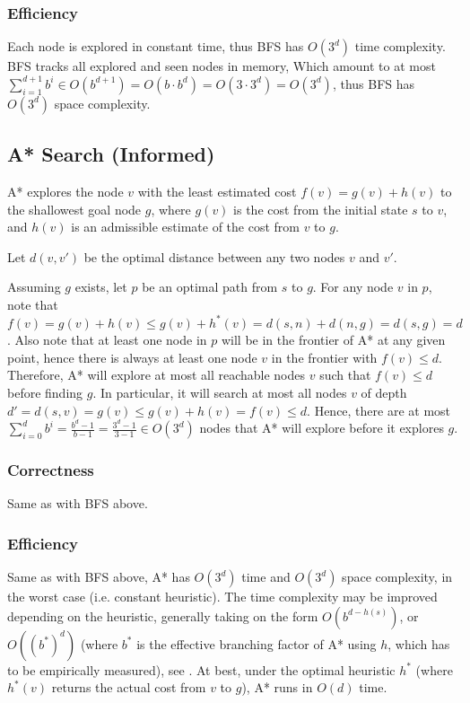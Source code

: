 \documentclass[runningheads]{llncs}
\begin{document}
\subsubsection{Efficiency}
Each node is explored in constant time, thus BFS has $O(3^d)$ time complexity. BFS tracks all explored and seen nodes in memory, Which amount to at most $\sum_{i=1}^{d+1} b^i \in O(b^{d+1}) = O(b \cdot b^d) = O(3 \cdot 3^d) = O(3^d)$, thus BFS has $O(3^d)$ space complexity.

\subsection{A* Search (Informed)}

A* explores the node $v$ with the least estimated cost $f(v) = g(v) + h(v)$ to the shallowest goal node $g$, where $g(v)$ is the cost from the initial state $s$ to $v$, and $h(v)$ is an admissible estimate of the cost from $v$ to $g$.

Let $d(v,v')$ be the optimal distance between any two nodes $v$ and $v'$.

Assuming $g$ exists, let $p$ be an optimal path from $s$ to $g$. For any node $v$ in $p$, note that $f(v) = g(v) + h(v) \leq g(v) + h^\ast(v) = d(s,n)+d(n,g) = d(s,g) = d$. Also note that at least one node in $p$ will be in the frontier of A* at any given point, hence there is always at least one node $v$ in the frontier with $f(v) \leq d$. Therefore, A* will explore at most all reachable nodes $v$ such that $f(v) \leq d$ before finding $g$. In particular, it will search at most all nodes $v$ of depth $d' = d(s,v) = g(v) \leq g(v)+h(v) = f(v) \leq d$. Hence, there are at most $\sum_{i=0}^d b^i = \frac{b^d-1}{b-1} = \frac{3^d-1}{3-1} \in O(3^d)$ nodes that A* will explore before it explores $g$.

\subsubsection{Correctness}
Same as with BFS above.

\subsubsection{Efficiency}
Same as with BFS above, A* has $O(3^d)$ time and $O(3^d)$ space complexity, in the worst case (i.e. constant heuristic). The time complexity may be improved depending on the heuristic, generally taking on the form $O(b^{d-h(s)})$, or $O((b^\ast)^d)$ (where $b^\ast$ is the effective branching factor of A* using $h$, which has to be empirically measured), see \cite{AIMA-A*Complexity}. At best, under the optimal heuristic $h^\ast$ (where $h^\ast(v)$ returns the actual cost from $v$ to $g$), A* runs in $O(d)$ time.
\end{document}
